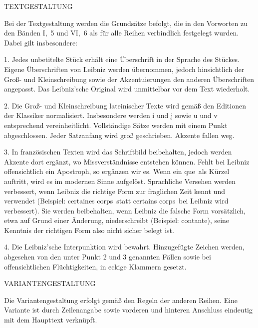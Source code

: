 \thispagestyle{empty}
{\vrule height 0mm depth 30mm width 0mm}
\par\noindent 
\uppercase{Textgestaltung}\par\vspace{1.0ex}
\noindent Bei der Textgestaltung werden die Grundsätze befolgt, die in den Vorworten zu den Bänden I,~5 und VI,~6 als für alle Reihen verbindlich festgelegt wurden. Dabei gilt insbesondere:\par
1. Jedes unbetitelte Stück erhält eine Überschrift in der Sprache des Stückes. Eigene Überschriften von Leibniz werden übernommen, jedoch hinsichtlich der Groß- und Kleinschreibung sowie der Akzentuierungen den anderen Überschriften angepasst. Das Leibniz'sche Original wird unmittelbar vor dem Text wiederholt.\par
2. Die Groß- und Kleinschreibung lateinischer Texte wird gemäß den Editionen der Klassiker normalisiert. Insbesondere werden i und j sowie u und v entsprechend vereinheitlicht. Vollständige Sätze werden mit einem Punkt abgeschlossen. Jeder Satzanfang wird groß geschrieben. Akzente fallen weg.\par
3. In französischen Texten wird das Schriftbild beibehalten, jedoch werden Akzente dort ergänzt, wo Missverständnisse entstehen können. Fehlt bei Leibniz offensichtlich ein Apostroph, so ergänzen wir es. Wenn ein \glqq que\grqq\ als Kürzel auftritt, wird es im modernen Sinne aufgelöst. Sprachliche Versehen werden verbessert, wenn Leibniz die richtige Form zur fraglichen Zeit kennt und verwendet (Beispiel: \glqq certaines corps\grqq\ statt \glqq certains corps\grqq\ bei Leibniz wird verbessert). Sie werden beibehalten, wenn Leibniz die falsche Form vorsätzlich, etwa auf Grund einer Änderung, niederschreibt (Beispiel: contante), seine Kenntnis der richtigen Form also nicht sicher belegt ist.\par
4. Die Leibniz'sche Interpunktion wird bewahrt. Hinzugefügte Zeichen werden, abgesehen von den unter Punkt 2 und 3 genannten Fällen sowie bei offensichtlichen Flüchtigkeiten, in eckige Klammern gesetzt.\par
\par\vspace{5.0ex}
\noindent\uppercase{Variantengestaltung}\par\vspace{1.0ex}
\noindent
Die Variantengestaltung erfolgt gemäß den Regeln der anderen Reihen. Eine Variante ist durch Zeilenangabe sowie vorderen und hinteren Anschluss eindeutig mit dem Haupttext verknüpft.
